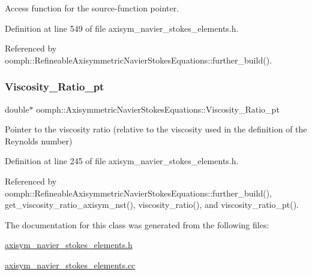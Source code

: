 Access function for the source-\/function pointer. 



Definition at line 549 of file axisym\+\_\+navier\+\_\+stokes\+\_\+elements.\+h.



Referenced by oomph\+::\+Refineable\+Axisymmetric\+Navier\+Stokes\+Equations\+::further\+\_\+build().

\mbox{\label{classoomph_1_1AxisymmetricNavierStokesEquations_ae41d608ac948d93ee57630389571b745}} 
\subsubsection{\texorpdfstring{Viscosity\+\_\+\+Ratio\+\_\+pt}{Viscosity\_Ratio\_pt}}
{\footnotesize\ttfamily double$\ast$ oomph\+::\+Axisymmetric\+Navier\+Stokes\+Equations\+::\+Viscosity\+\_\+\+Ratio\+\_\+pt\hspace{0.3cm}{\ttfamily [protected]}}



Pointer to the viscosity ratio (relative to the viscosity used in the definition of the Reynolds number) 



Definition at line 245 of file axisym\+\_\+navier\+\_\+stokes\+\_\+elements.\+h.



Referenced by oomph\+::\+Refineable\+Axisymmetric\+Navier\+Stokes\+Equations\+::further\+\_\+build(), get\+\_\+viscosity\+\_\+ratio\+\_\+axisym\+\_\+nst(), viscosity\+\_\+ratio(), and viscosity\+\_\+ratio\+\_\+pt().



The documentation for this class was generated from the following files\+:\begin{DoxyCompactItemize}
\item 
\hyperlink{axisym__navier__stokes__elements_8h}{axisym\+\_\+navier\+\_\+stokes\+\_\+elements.\+h}\item 
\hyperlink{axisym__navier__stokes__elements_8cc}{axisym\+\_\+navier\+\_\+stokes\+\_\+elements.\+cc}\end{DoxyCompactItemize}
